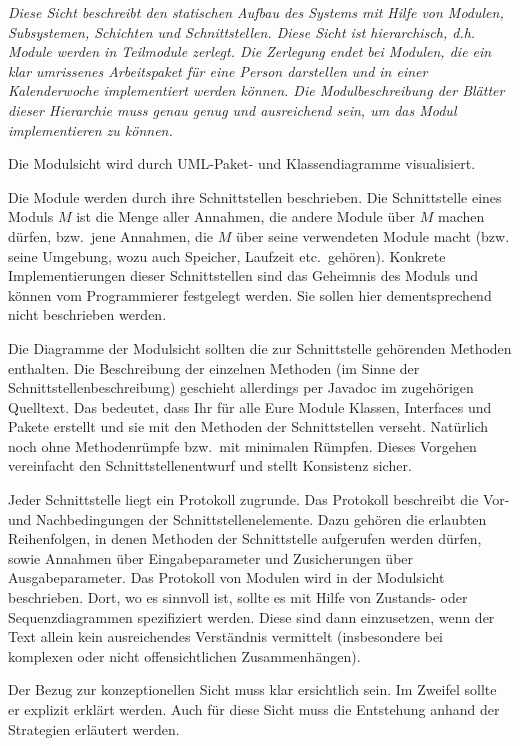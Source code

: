 \documentclass[fontsize=12pt,paper=a4,twoside]{scrartcl}
\begin{document}
{\it
Diese Sicht beschreibt den statischen Aufbau des Systems mit Hilfe von
Modulen, Subsystemen, Schichten und Schnittstellen. 
Diese Sicht ist hierarchisch, d.h. Module werden in Teilmodule
zerlegt. Die Zerlegung endet bei Modulen, die ein klar umrissenes
Arbeitspaket für eine Person darstellen und in einer Kalenderwoche
implementiert werden können. Die Modulbeschreibung der Blätter dieser
Hierarchie muss genau genug und ausreichend sein, um das Modul 
implementieren zu können.

Die Modulsicht wird durch {UML}-Paket- und Klassendiagramme visualisiert.

Die Module werden durch ihre Schnittstellen beschrieben. 
Die Schnittstelle eines Moduls $M$ ist die Menge aller Annahmen, die
andere Module über $M$ machen dürfen, bzw.\ jene Annahmen, die $M$
über seine verwendeten Module macht (bzw. seine Umgebung, wozu auch
Speicher, Laufzeit etc.\ gehören).
Konkrete Implementierungen dieser Schnittstellen sind das Geheimnis des Moduls
und können vom Programmierer festgelegt werden. Sie sollen hier
dementsprechend nicht beschrieben werden. 

Die Diagramme der Modulsicht sollten die zur Schnittstelle gehörenden Methoden
enthalten. Die Beschreibung der einzelnen Methoden (im Sinne der Schnittstellenbeschreibung)
geschieht allerdings per Javadoc im zugehörigen Quelltext. Das bedeutet, dass Ihr
für alle Eure Module Klassen, Interfaces und Pakete erstellt und sie mit den Methoden der
Schnittstellen verseht. Natürlich noch ohne Methodenrümpfe bzw.\ mit minimalen Rümpfen.
Dieses Vorgehen vereinfacht den Schnittstellenentwurf und stellt Konsistenz sicher.

Jeder Schnittstelle liegt ein
Protokoll zugrunde. Das Protokoll beschreibt die Vor- und
Nachbedingungen der Schnittstellenelemente. Dazu gehören die erlaubten
Reihenfolgen, in denen Methoden der Schnittstelle aufgerufen werden
dürfen, sowie Annahmen über Eingabeparameter und Zusicherungen über
Ausgabeparameter. Das Protokoll von Modulen wird in der Modulsicht beschrieben.
Dort, wo es sinnvoll ist, sollte es mit Hilfe von Zustands- oder
Sequenzdiagrammen spezifiziert werden. Diese sind dann einzusetzen, wenn der
Text allein kein ausreichendes Verständnis vermittelt (insbesondere
bei komplexen oder nicht offensichtlichen Zusammenhängen).

Der Bezug zur konzeptionellen Sicht muss klar ersichtlich sein. Im
Zweifel sollte er explizit erklärt werden. Auch für diese Sicht muss
die Entstehung anhand der Strategien erläutert werden.
}
\end{document}
